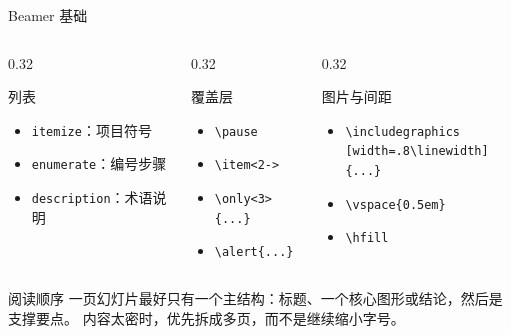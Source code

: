 \documentclass[aspectratio=169,10pt]{ctexbeamer}
\begin{document}
\begin{academicframe}{Beamer 基础}
  \begin{columns}[T,onlytextwidth]
    \begin{column}{0.32\textwidth}
      \begin{block}{列表}
        \scriptsize
        \begin{itemize}
          \item \texttt{itemize}：项目符号
          \item \texttt{enumerate}：编号步骤
          \item \texttt{description}：术语说明
        \end{itemize}
      \end{block}
    \end{column}
    \begin{column}{0.32\textwidth}
      \begin{exampleblock}{覆盖层}
        \scriptsize
        \begin{itemize}
          \item \texttt{\textbackslash pause}
          \item \texttt{\textbackslash item<2->}
          \item \texttt{\textbackslash only<3>\{...\}}
          \item \texttt{\textbackslash alert\{...\}}
        \end{itemize}
      \end{exampleblock}
    \end{column}
    \begin{column}{0.32\textwidth}
      \begin{alertblock}{图片与间距}
        \scriptsize
        \begin{itemize}
          \item \texttt{\textbackslash includegraphics}\\
            \texttt{[width=.8\textbackslash linewidth]\{...\}}
          \item \texttt{\textbackslash vspace\{0.5em\}}
          \item \texttt{\textbackslash hfill}
        \end{itemize}
      \end{alertblock}
    \end{column}
  \end{columns}

  \vspace{0.45em}
  \begin{exampleblock}{阅读顺序}
    \scriptsize
    一页幻灯片最好只有一个主结构：标题、一个核心图形或结论，然后是支撑要点。
    内容太密时，优先拆成多页，而不是继续缩小字号。
  \end{exampleblock}
\end{academicframe}
\end{document}
